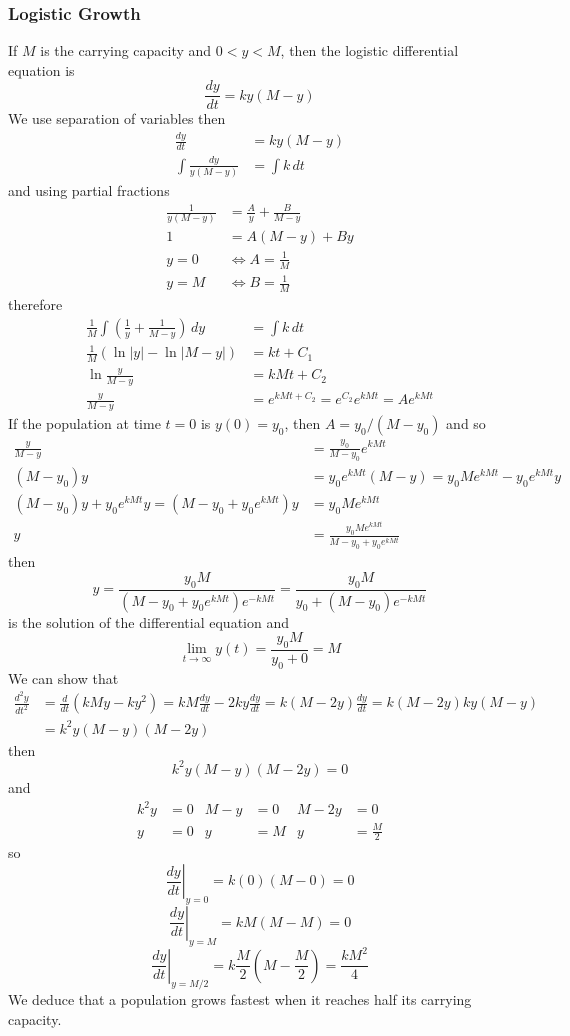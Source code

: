 \subsubsection{Logistic Growth}
If \(M\) is the carrying capacity and \(0<y<M\), then the logistic
differential equation is
\[\frac{dy}{dt}=ky(M-y)\]
We use separation of variables then
\begin{align*}
    \frac{dy}{dt} &= ky(M-y) \\
    \int\frac{dy}{y(M-y)} &= \int k\,dt
\end{align*}
and using partial fractions
\begin{align*}
    \frac{1}{y(M-y)} &= \frac{A}{y}+\frac{B}{M-y} \\
    1 &= A(M-y)+By \\
    y=0 &\iff A=\frac{1}{M} \\
    y=M &\iff B=\frac{1}{M}
\end{align*}
therefore
\begin{align*}
    \frac{1}{M}\int\left(\frac{1}{y}+\frac{1}{M-y}\right)\,dy &= \int k\,dt \\
    \frac{1}{M}(\ln|y|-\ln|M-y|) &= kt+C_1 \\
    \ln\frac{y}{M-y} &= kMt+C_2 \\
    \frac{y}{M-y} &= e^{kMt+C_2}=e^{C_2}e^{kMt}=Ae^{kMt}
\end{align*}
If the population at time \(t=0\) is \(y(0)=y_0\),
then \(A=y_0/(M-y_0)\) and so
\begin{align*}
    \frac{y}{M-y} &= \frac{y_0}{M-y_0}e^{kMt} \\
    (M-y_0)y &= y_0e^{kMt}(M-y)=y_0Me^{kMt}-y_0e^{kMt}y \\
    (M-y_0)y+y_0e^{kMt}y=(M-y_0+y_0e^{kMt})y &= y_0Me^{kMt} \\
    y &= \frac{y_0Me^{kMt}}{M-y_0+y_0e^{kMt}}
\end{align*}
then
\[y=\frac{y_0M}{(M-y_0+y_0e^{kMt})e^{-kMt}}=\frac{y_0M}{y_0+(M-y_0)e^{-kMt}}\]
is the solution of the differential equation and
\[\lim_{t\to\infty}y(t)=\frac{y_0M}{y_0+0}=M\]
We can show that
\begin{align*}
    \frac{d^2y}{dt^2} &= \frac{d}{dt}(kMy-ky^2)=kM\frac{dy}{dt}-2ky\frac{dy}{dt}
    =k(M-2y)\frac{dy}{dt}=k(M-2y)ky(M-y) \\
    &= k^2y(M-y)(M-2y)
\end{align*}
then
\[k^2y(M-y)(M-2y)=0\]
and
\begin{align*}
    k^2y &= 0 & M-y &= 0 & M-2y &= 0 \\
    y &= 0 & y &= M & y &= \frac{M}{2}
\end{align*}
so
\[\left.\frac{dy}{dt}\right|_{y=0}=k(0)(M-0)=0\]
\[\left.\frac{dy}{dt}\right|_{y=M}=kM(M-M)=0\]
\[\left.\frac{dy}{dt}\right|_{y=M/2}=k\frac{M}{2}\left(M-\frac{M}{2}\right)
=\frac{kM^2}{4}\]
We deduce that a population grows fastest when it reaches half its carrying
capacity.

